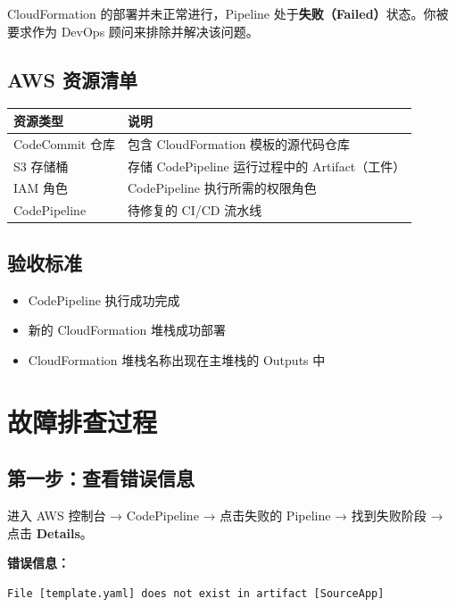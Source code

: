 \documentclass[12pt, a4paper]{article}
\begin{document}
CloudFormation 的部署并未正常进行，Pipeline 处于\textbf{失败（Failed）}状态。你被要求作为 DevOps 顾问来排除并解决该问题。

\subsection{AWS 资源清单}

\begin{tabularx}{\textwidth}{lX}
  \toprule
  \textbf{资源类型} & \textbf{说明} \\
  \midrule
  CodeCommit 仓库 & 包含 CloudFormation 模板的源代码仓库 \\
  S3 存储桶 & 存储 CodePipeline 运行过程中的 Artifact（工件） \\
  IAM 角色 & CodePipeline 执行所需的权限角色 \\
  CodePipeline & 待修复的 CI/CD 流水线 \\
  \bottomrule
\end{tabularx}

\subsection{验收标准}

\begin{itemize}[leftmargin=2em]
  \item CodePipeline 执行成功完成
  \item 新的 CloudFormation 堆栈成功部署
  \item CloudFormation 堆栈名称出现在主堆栈的 Outputs 中
\end{itemize}

\newpage

\section{故障排查过程}

\subsection{第一步：查看错误信息}

进入 AWS 控制台 → CodePipeline → 点击失败的 Pipeline → 找到失败阶段 → 点击 \textbf{Details}。

\begin{notebox}
\textbf{错误信息：}
\begin{lstlisting}
File [template.yaml] does not exist in artifact [SourceApp]
\end{lstlisting}
\end{notebox}
\end{document}
